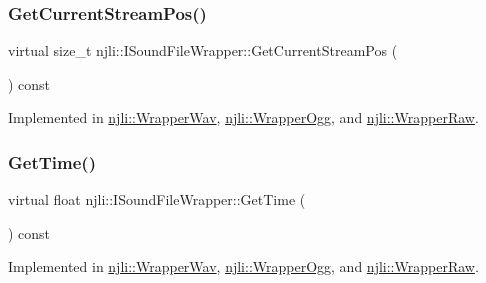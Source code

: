 \mbox{\label{classnjli_1_1_i_sound_file_wrapper_a7468aaf1e53cfd6feb38eae4ecf8ab99}} 
\subsubsection{\texorpdfstring{Get\+Current\+Stream\+Pos()}{GetCurrentStreamPos()}}
{\footnotesize\ttfamily virtual size\+\_\+t njli\+::\+I\+Sound\+File\+Wrapper\+::\+Get\+Current\+Stream\+Pos (\begin{DoxyParamCaption}{ }\end{DoxyParamCaption}) const\hspace{0.3cm}{\ttfamily [pure virtual]}}



Implemented in \mbox{\hyperlink{classnjli_1_1_wrapper_wav_ac7f741a2d2db3126eec69b64eb2cacfc}{njli\+::\+Wrapper\+Wav}}, \mbox{\hyperlink{classnjli_1_1_wrapper_ogg_a90e11afb177a4085c5925af77436cd91}{njli\+::\+Wrapper\+Ogg}}, and \mbox{\hyperlink{classnjli_1_1_wrapper_raw_a66e31271020e3b7e7c48ecda73ed0351}{njli\+::\+Wrapper\+Raw}}.

\mbox{\label{classnjli_1_1_i_sound_file_wrapper_afefb180620c4a6e17e994a867726eb29}} 
\subsubsection{\texorpdfstring{Get\+Time()}{GetTime()}}
{\footnotesize\ttfamily virtual float njli\+::\+I\+Sound\+File\+Wrapper\+::\+Get\+Time (\begin{DoxyParamCaption}{ }\end{DoxyParamCaption}) const\hspace{0.3cm}{\ttfamily [pure virtual]}}



Implemented in \mbox{\hyperlink{classnjli_1_1_wrapper_wav_a0cfe149e0e1089f153401f3c80a222df}{njli\+::\+Wrapper\+Wav}}, \mbox{\hyperlink{classnjli_1_1_wrapper_ogg_a0fdf09ad6e5bde3de915140c39698a97}{njli\+::\+Wrapper\+Ogg}}, and \mbox{\hyperlink{classnjli_1_1_wrapper_raw_a1b236f8ef4b7bffe5b5a68d29c855cf3}{njli\+::\+Wrapper\+Raw}}.

